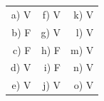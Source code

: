 \documentclass[12pt]{article}
\begin{document}
\section{}
	\begin{tabular}{rrr}
		\hspace{+32pt} a) V \hspace{+32pt} & f) V \hspace{+32pt} & k) V \\
		\hspace{+32pt} b) F \hspace{+32pt} & g) V \hspace{+32pt} & l) V \\
		\hspace{+32pt} c) F \hspace{+32pt} & h) F \hspace{+32pt} & m) V \\
		\hspace{+32pt} d) V \hspace{+32pt} & i) F \hspace{+32pt} & n) V \\
		\hspace{+32pt} e) V \hspace{+32pt} & j) V \hspace{+32pt} & o) V \\
	\end{tabular}
\end{document}
